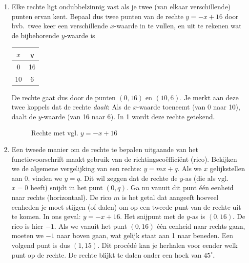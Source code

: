\begin{enumerate}
    \item  Elke rechte ligt ondubbelzinnig vast als je twee (van elkaar
verschillende) punten ervan kent. Bepaal dus twee punten van
de rechte $y=-x+16$ door bvb.\ twee keer een verschillende $x$-waarde
in te vullen, en uit te rekenen wat de bijbehorende $y$-waarde
is 

\begin{center}
    \begin{tabular}{c|c}
    $x$ & $y$  \\
    \hline
    0 & 16  \\
    10 & 6  \\
\end{tabular}


\end{center}

De rechte gaat dus door de punten $(0,16)$ en $(10,6)$. Je merkt
aan deze twee koppels dat de rechte \emph{daalt}: Als de $x$-waarde
toeneemt (van 0 naar 10), daalt de $y$-waarde (van 16 naar
6). In \cref{fig:maxdierrechte} wordt deze rechte getekend.

\begin{figure}[htbp]
    \centering
{}
\caption{Rechte met vgl. $y=-x+16$}
    \label{fig:maxdierrechte}
\end{figure}

    \item  Een tweede manier om de rechte te bepalen uitgaande van het functievoorschrift
maakt gebruik van de richtingsco\"{e}ffici\"{e}nt (rico). Bekijken
we de algemene vergelijking van een rechte: $y=mx+q$.
Als we $x$ gelijkstellen aan 0, vinden we $y=q$. Dit
wil zeggen dat de rechte de $y$-as (die als vgl.\ $x=0$ heeft)
snijdt in het punt $(0,q)$. Ga nu vanuit dit punt \'e\'en eenheid naar
rechts (horizontaal). De rico $m$ is het getal dat aangeeft hoeveel eenheden 
je moet stijgen (of dalen) om op een tweede punt van de rechte
uit te komen. In ons geval: $y=-x+16$. Het snijpunt
met de $y$-as is $(0,16)$. De rico is hier $-1$. Als we vanuit het
punt $(0,16)$ \'e\'en eenheid naar rechts gaan, moeten we $-1$ naar boven
gaan, wat gelijk staat aan 1 naar beneden. Een volgend punt is
dus $(1,15)$. Dit proc\'ed\'e kan je herhalen voor eender welk punt op de rechte. De rechte blijkt te dalen onder een hoek van
$45^{\circ}$.
\end{enumerate}


